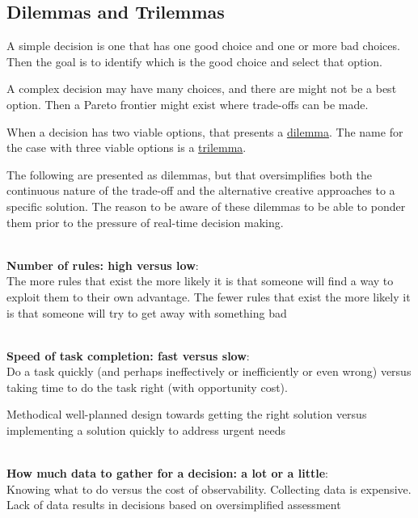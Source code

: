 \subsection{Dilemmas and Trilemmas\label{sec:dilemma_trilemma}}

A simple decision is one that has one good choice and one or more bad choices. Then the goal is to identify which is the good choice and select that option.

A complex decision may have many choices, and there are might not be a best option. Then a Pareto frontier might exist where trade-offs can be made. 

When a decision has two viable options, that presents a \href{https://en.wikipedia.org/wiki/Dilemma}{dilemma}. The name for the case with three viable options is a \href{https://en.wikipedia.org/wiki/Trilemma}{trilemma}.

The following are presented as dilemmas, but that oversimplifies both the continuous nature of the trade-off and the alternative creative approaches to a specific solution. The reason to be aware of these dilemmas to be able to ponder them prior to the pressure of real-time decision making. 

\ \\

\textbf{Number of rules: high versus low}:\\
The more rules that exist the more likely it is that someone will find a way to exploit them to their own advantage.
The fewer rules that exist the more likely it is that someone will try to get away with something bad


\ \\

\textbf{Speed of task completion: fast versus slow}:\\
Do a task quickly (and perhaps ineffectively or inefficiently or even wrong) versus taking time to do the task right (with opportunity cost).

Methodical well-planned design towards getting the right solution versus implementing a solution quickly to address urgent needs


\ \\

\textbf{How much data to gather for a decision: a lot or a little}:\\
Knowing what to do versus the cost of observability. Collecting data is expensive. Lack of data results in decisions based on oversimplified assessment

